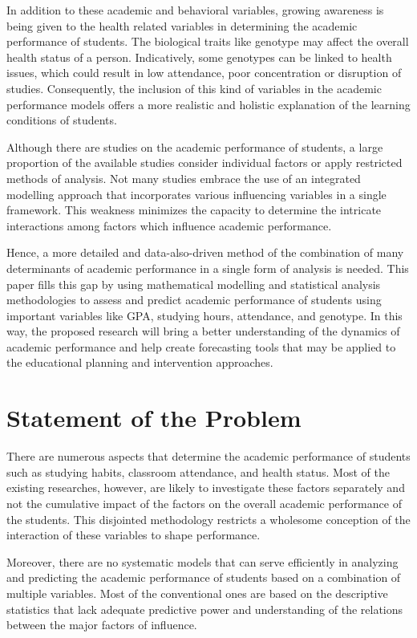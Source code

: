 \documentclass[12pt]{report}
\begin{document}
	In addition to these academic and behavioral variables, growing awareness is being given to the health related variables in determining the academic performance of students. The biological traits like genotype may affect the overall health status of a person. Indicatively, some genotypes can be linked to health issues, which could result in low attendance, poor concentration or disruption of studies. Consequently, the inclusion of this kind of variables in the academic performance models offers a more realistic and holistic explanation of the learning conditions of students.
	
	Although there are studies on the academic performance of students, a large proportion of the available studies consider individual factors or apply restricted methods of analysis. Not many studies embrace the use of an integrated modelling approach that incorporates various influencing variables in a single framework. This weakness minimizes the capacity to determine the intricate interactions among factors which influence academic performance.
	
	Hence, a more detailed and data-also-driven method of the combination of many determinants of academic performance in a single form of analysis is needed. This paper fills this gap by using mathematical modelling and statistical analysis methodologies to assess and predict academic performance of students using important variables like GPA, studying hours, attendance, and genotype. In this way, the proposed research will bring a better understanding of the dynamics of academic performance and help create forecasting tools that may be applied to the educational planning and intervention approaches.
	
	
	
	\section{Statement of the Problem}
	
	There are numerous aspects that determine the academic performance of students such as studying habits, classroom attendance, and health status. Most of the existing researches, however, are likely to investigate these factors separately and not the cumulative impact of the factors on the overall academic performance of the students. This disjointed methodology restricts a wholesome conception of the interaction of these variables to shape performance.
	
	Moreover, there are no systematic models that can serve efficiently in analyzing and predicting the academic performance of students based on a combination of multiple variables. Most of the conventional ones are based on the descriptive statistics that lack adequate predictive power and understanding of the relations between the major factors of influence.
	
\end{document}
